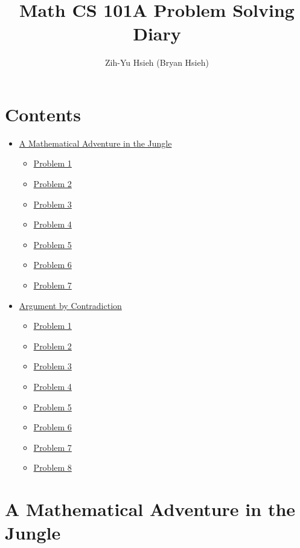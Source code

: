 \documentclass{article}
\title{Math CS 101A Problem Solving Diary}
\author{Zih-Yu Hsieh (Bryan Hsieh)}
\begin{document}
\maketitle

\section*{Contents}
\begin{itemize}
    \item \hyperlink{section.1}{A Mathematical Adventure in the Jungle}
    \begin{itemize}
        \item{} \hyperlink{subsection.1.1}{Problem 1}
        \item{} \hyperlink{subsection.1.2}{Problem 2}
        \item{} \hyperlink{subsection.1.3}{Problem 3}
        \item{} \hyperlink{subsection.1.4}{Problem 4}
        \item{} \hyperlink{subsection.1.5}{Problem 5}
        \item{} \hyperlink{subsection.1.6}{Problem 6}
        \item{} \hyperlink{subsection.1.7}{Problem 7}
    \end{itemize}
    \item \hyperlink{section.2}{Argument by Contradiction}
    \begin{itemize}
        \item{} \hyperlink{subsection.2.1}{Problem 1}
        \item{} \hyperlink{subsection.2.2}{Problem 2}
        \item{} \hyperlink{subsection.2.3}{Problem 3}
        \item{} \hyperlink{subsection.2.4}{Problem 4}
        \item{} \hyperlink{subsection.2.5}{Problem 5}
        \item{} \hyperlink{subsection.2.6}{Problem 6}
        \item{} \hyperlink{subsection.2.7}{Problem 7}
        \item{} \hyperlink{subsection.2.8}{Problem 8}
    \end{itemize}
\end{itemize}

\break

\section{A Mathematical Adventure in the Jungle}
\end{document}
